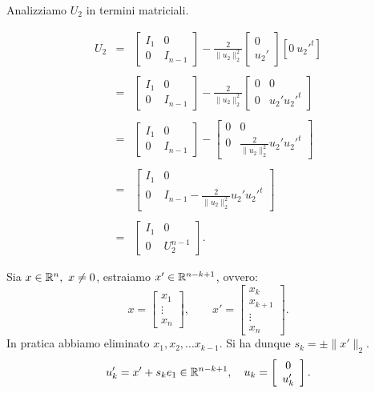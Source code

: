 Analizziamo $U_2$ in termini matriciali.

\[
\begin{array}{lcl}
U_2 & = &
 \left[
 \begin{array}{c|c}
 I_1 & 0 \\
 \hline
 0 & I_{n-1}
 \end{array}
 \right] - \frac{2}{\|u_2\|_2^2}\left[\begin{array}{c}0 \\ u_2'\end{array}
 \right]\left[0\ u_2'^t\right]\\
\\
& = & \left[
 \begin{array}{c|c}
 I_1 & 0 \\
 \hline
 0 & I_{n-1}
 \end{array}
 \right] - \frac{2}{\|u_2\|_2^2}\left[
 \begin{array}{c|c}
 0 & 0 \\
 \hline
 0 & u_2'u_2'^t
 \end{array}
 \right] \\
\\
& = & \left[
 \begin{array}{c|c}
 I_1 & 0 \\
 \hline
 0 & I_{n-1}
 \end{array}
 \right] - \left[
 \begin{array}{c|c}
 0 & 0\\
 \hline
 0 & \frac{2}{\|u_2\|_2^2}u_2'u_2'^t
 \end{array}
 \right] \\
\\
& = & \left[
 \begin{array}{c|c}
 I_1 & 0 \\
 \hline
 0 & I_{n-1} - \frac{2}{\|u_2\|_2^2}u_2'u_2'^t
 \end{array}
 \right]\\
\\
& = & \left[
 \begin{array}{c|c}
 I_1 & 0 \\
 \hline
 0 & U_2^{n-1}
 \end{array}
 \right].
\end{array}
\]

Sia $x \in \mathbb{R}^n, \ x \neq 0$, estraiamo $x' \in \mathbb{R}^{n-k+1}$, ovvero:
\[
x = \left[
\begin{array}{c}
x_1 \\
\vdots \\
x_n
\end{array}\right], \qquad
x' =
\left[
\begin{array}{c}
x_k \\
x_{k+1}\\
\vdots \\
x_n
\end{array}\right].
\]
In pratica abbiamo eliminato $x_1, x_2, \ldots x_{k-1}$.
Si ha dunque $s_k =\pm \|x'\|_2$.
\[u_k' = x' + s_ke_1 \in \mathbb{R}^{n-k+1}, \quad u_k =
\left[
\begin{array}{c}
0 \\
u_k'
\end{array}\right].\]


